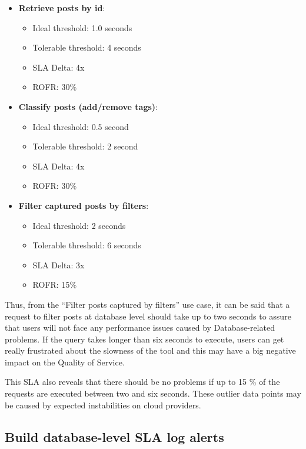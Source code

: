\begin{itemize}
\item{
\textbf{Retrieve posts by id}:
	\begin{itemize}
		\item{Ideal threshold: 1.0 seconds}
		\item{Tolerable threshold: 4 seconds}
		\item{SLA Delta: 4x}
		\item{ROFR: 30\%}
	\end{itemize}
}
\item{

\textbf{Classify posts (add/remove tags)}:
	\begin{itemize}
		\item{Ideal threshold: 0.5 second}
		\item{Tolerable threshold: 2 second}
		\item{SLA Delta: 4x}
		\item{ROFR: 30\%}
	\end{itemize}
}

\item{
	\textbf{Filter captured posts by filters}:
	\begin{itemize}
		\item{Ideal threshold: 2 seconds}
		\item{Tolerable threshold: 6 seconds}
		\item{SLA Delta: 3x}
		\item{ROFR: 15\%}
	\end{itemize}
}
\end{itemize}

Thus, from the ``Filter posts captured by filters'' use case, it can be said that a request to filter posts at database level should take up to two seconds to assure that users will not face any performance issues caused by Database-related problems. If the query takes longer than six seconds to execute, users can get really frustrated about the slowness of the tool and this may have a big negative impact on the Quality of Service. 

This SLA also reveals that there should be no problems if up to 15 \% of the requests are executed between two and six seconds. These outlier data points may be caused by expected instabilities on cloud providers. 

\clearpage
\subsection{Build database-level SLA log alerts}

